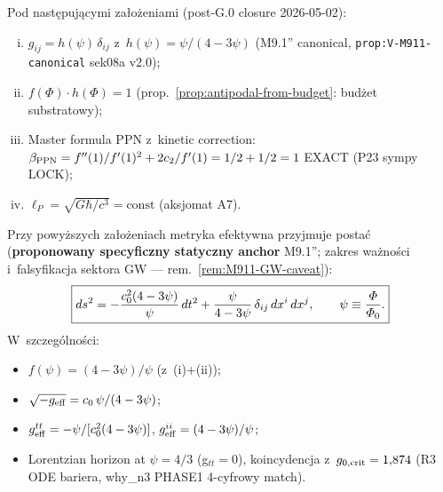\begin{theorem}%
\label{thm:metric-from-budget-M911-canonical}

Pod nast\k{e}puj\k{a}cymi za\l{}o\.zeniami (post-G.0 closure 2026-05-02):
\begin{enumerate}[(i),nosep]
  \item $g_{ij} = h(\psi)\,\delta_{ij}$ z~$h(\psi) = \psi/(4-3\psi)$
        (M9.1'' canonical, \texttt{prop:V-M911-canonical} sek08a v2.0);
  \item $f(\Phi)\cdot h(\Phi) = 1$
        (prop.~\ref{prop:antipodal-from-budget}: bud\.zet substratowy);
  \item Master formula PPN z~kinetic correction:
        $\beta_{\rm PPN} = f''(1)/f'(1)^2 + 2c_2/f'(1) = 1/2 + 1/2 = 1$
        EXACT (P23 sympy LOCK);
  \item $\ell_P = \sqrt{G\hbar/c^3} = \text{const}$ (aksjomat A7).
\end{enumerate}
Przy powy\.zszych za\l{}o\.zeniach metryka efektywna przyjmuje
posta\'c (\textbf{proponowany specyficzny statyczny anchor} M9.1'';
zakres wa\.zno\'sci i~falsyfikacja sektora GW --- rem.~\ref{rem:M911-GW-caveat}):
\begin{equation}\label{eq:metric-M911-canonical}
  \boxed{
    ds^2 = -\frac{c_0^2(4-3\psi)}{\psi}\,dt^2
         + \frac{\psi}{4-3\psi}\,\delta_{ij}\,dx^i\,dx^j,
    \qquad \psi \equiv \frac{\varPhi}{\varPhi_0}.
  }
\end{equation}
W~szczeg\'olno\'sci:
\begin{itemize}[nosep]
  \item $f(\psi) = (4-3\psi)/\psi$ (z~(i)+(ii));
  \item $\sqrt{-g_{\rm eff}} = c_0\,\psi/(4-3\psi)$;
  \item $g_{\rm eff}^{tt} = -\psi/[c_0^2(4-3\psi)]$,
        $g_{\rm eff}^{ii} = (4-3\psi)/\psi$;
  \item Lorentzian horizon at $\psi = 4/3$ (g$_{tt}=0$),
        koincydencja z~$g_{0,{\rm crit}} = 1{,}874$ (R3 ODE bariera, why\_n3
        PHASE1 4-cyfrowy match).
\end{itemize}
\end{theorem}

